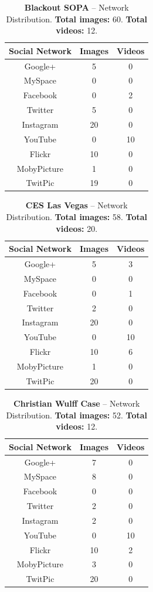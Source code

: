 \documentclass{acm_proc_article-sp}
\begin{document}
\begin{table}[htbp]
  \begin{tabular}{ | c | c | c | }
    \hline
    \textbf{Social Network} & \textbf{Images} & \textbf{Videos}\\
    \hline
    Google+ & 5 & 0\\
    MySpace & 0 & 0\\
    Facebook & 0 & 2\\
    Twitter & 5 & 0\\
    Instagram & 20 & 0\\
    YouTube & 0 & 10\\
    Flickr & 10 & 0\\
    MobyPicture & 1 & 0\\
    TwitPic & 19 & 0\\
    \hline
  \end{tabular}
  \label{tab:sopa}
  \caption{\textbf{Blackout SOPA} -- Network Distribution. \textbf{Total images:} 60. \textbf{Total videos:} 12.}
\end{table}

\begin{table}[htbp]
  \begin{tabular}{ | c | c | c | }
    \hline
    \textbf{Social Network} & \textbf{Images} & \textbf{Videos}\\
    \hline
    Google+ & 5 & 3\\
    MySpace & 0 & 0\\
    Facebook & 0 & 1\\
    Twitter & 2 & 0\\
    Instagram & 20 & 0\\
    YouTube & 0 & 10\\
    Flickr & 10 & 6\\
    MobyPicture & 1 & 0\\
    TwitPic & 20 & 0\\
    \hline
  \end{tabular}
  \label{tab:ces}
  \caption{\textbf{CES Las Vegas} -- Network Distribution. \textbf{Total images:} 58. \textbf{Total videos:} 20.}
\end{table}

\begin{table}[htbp]
  \begin{tabular}{ | c | c | c | }
    \hline
    \textbf{Social Network} & \textbf{Images} & \textbf{Videos}\\
    \hline
    Google+ & 7 & 0\\
    MySpace & 8 & 0\\
    Facebook & 0 & 0\\
    Twitter & 2 & 0\\
    Instagram & 2 & 0\\
    YouTube & 0 & 10\\
    Flickr & 10 & 2\\
    MobyPicture & 3 & 0\\
    TwitPic & 20 & 0\\
    \hline
  \end{tabular}
  \label{tab:wulff}
  \caption{\textbf{Christian Wulff Case} -- Network Distribution. \textbf{Total images:} 52. \textbf{Total videos:} 12.}
\end{table}
\end{document}
